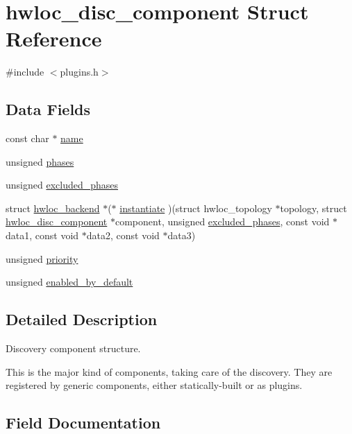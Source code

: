 \hypertarget{a00366}{}\section{hwloc\+\_\+disc\+\_\+component Struct Reference}
\label{a00366}


{\ttfamily \#include $<$plugins.\+h$>$}

\subsection*{Data Fields}
\begin{DoxyCompactItemize}
\item 
const char $\ast$ \hyperlink{a00366_a4064c3b5d9213027e87caebef380a840}{name}
\item 
unsigned \hyperlink{a00366_a61ad3151efa02e3dbad5d919758f9c90}{phases}
\item 
unsigned \hyperlink{a00366_acbb9957914dbf7b8f504215aa0c8d3fe}{excluded\+\_\+phases}
\item 
struct \hyperlink{a00374}{hwloc\+\_\+backend} $\ast$($\ast$ \hyperlink{a00366_ab133956219739a1032a17131757d1961}{instantiate} )(struct hwloc\+\_\+topology $\ast$topology, struct \hyperlink{a00366}{hwloc\+\_\+disc\+\_\+component} $\ast$component, unsigned \hyperlink{a00366_acbb9957914dbf7b8f504215aa0c8d3fe}{excluded\+\_\+phases}, const void $\ast$data1, const void $\ast$data2, const void $\ast$data3)
\item 
unsigned \hyperlink{a00366_ae86d283c272c5ae24073a235efbf6b59}{priority}
\item 
unsigned \hyperlink{a00366_ace80cafe2b1732b047b3fc3da47e6517}{enabled\+\_\+by\+\_\+default}
\end{DoxyCompactItemize}


\subsection{Detailed Description}
Discovery component structure. 

This is the major kind of components, taking care of the discovery. They are registered by generic components, either statically-\/built or as plugins. 

\subsection{Field Documentation}
\mbox{\label{a00366_ace80cafe2b1732b047b3fc3da47e6517}} 
